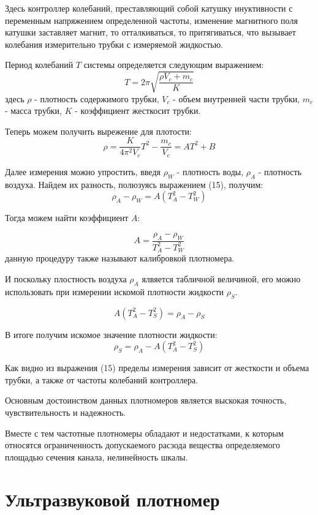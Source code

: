 \documentclass[russian, utf8]{eskdtext}
\begin{document}
Здесь контроллер колебаний, преставляющий собой катушку инуктивности с переменным напряжением определенной частоты, изменение магнитного поля катушки заставляет магнит, то отталкиваться, то притягиваться, что вызывает колебания измерительно трубки с измеряемой жидкостью. \par

Период колебаний $T$ системы определяется следующим выражением:
\begin{equation}
	T = 2\pi \sqrt{\frac{\rho V_c + m_c}{K}}
\end{equation}
здесь $\rho$ - плотность содержимого трубки, $V_c$ - объем внутренней части трубки, $m_c$ - масса трубки, $K$ - коэффициент жесткосит трубки. \par

Теперь можем получить вырежение для плотости: 
\begin{equation*}
	\rho = \frac{K}{4\pi^2 V_c}T^2 - \frac{m_c}{V_c} = AT^2 + B
\end{equation*}

Далее измерения можно упростить, введя $\rho_W$ - плотность воды, $\rho_A$ - плотность воздуха. Найдем их разность, полюзуясь выражением (15), получим:
\begin{equation*}
	\rho_A - \rho_W = A(T_A^2 - T_W^2)
\end{equation*}

Тогда можем найти коэффициент $A$:

\begin{equation*}
	A = \frac{\rho_A - \rho_W}{T_A^2 - T_W^2}
\end{equation*}
данную процедуру также называют калибровкой плотномера.

И поскольку плостность воздуха $\rho_A$ ялвяется табличной величиной, его можно использовать при измерении искомой плотности жидкости $\rho_S$.

\begin{equation*}
	A(T_A^2 - T_S^2) = \rho_A - \rho_S
\end{equation*}

В итоге получим искомое значение плотности жидкости:
\begin{equation}
	\rho_S = \rho_A - A(T_A^2 - T_S^2)
\end{equation}

Как видно из выражения (15) пределы измерения зависит от жесткости и объема трубки, а также от частоты колебаний контроллера. \par
Основным достоинством данных плотномеров является выскокая точность, чувствительность и надежность. \par
Вместе с тем частотные плотномеры обладают и недостатками, к которым относятся ограниченность допускаемого расзода вещества определяемого площадью сечения канала, нелинейность шкалы.

\newpage

\section{Ультразвуковой плотномер}
\end{document}
